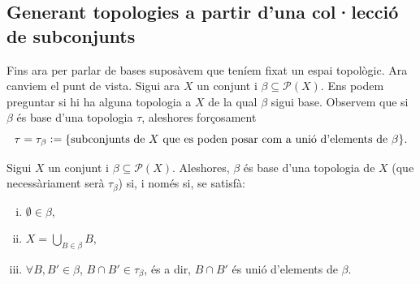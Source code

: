 \documentclass[../main.tex]{subfiles}
\begin{document}
\subsection{Generant topologies a partir d'una col·lecció de subconjunts}
Fins ara per parlar de bases suposàvem que teníem fixat un espai topològic. Ara canviem el punt de vista. Sigui ara $X$ un conjunt i $\beta\subseteq \mathscr{P}(X)$. Ens podem preguntar si hi ha alguna topologia a $X$ de la qual $\beta$ sigui base. Observem que si $\beta$ és base d'una topologia $\tau$, aleshores forçosament
\begin{equation}
    \notag
    \tau = \tau_\beta:=\{\text{subconjunts de $X$ que es poden posar com a unió d'elements de $\beta$}\}.
\end{equation}

\begin{prop}
\label{prop:bases2} Sigui $X$ un conjunt i $\beta\subseteq\mathscr{P}(X)$. Aleshores, $\beta$ és base d'una topologia de $X$ (que necessàriament serà $\tau_\beta$) si, i només si, se satisfà:
\begin{enumerate}[(i)]
    \item $\emptyset\in\beta$,
    \item $X = \bigcup_{B\in\beta} B$,
    \item $\forall B,B'\in\beta$, $B\cap B'\in \tau_\beta$, és a dir, $B\cap B'$ és unió d'elements de $\beta$.
\end{enumerate}
\end{prop}
\end{document}
